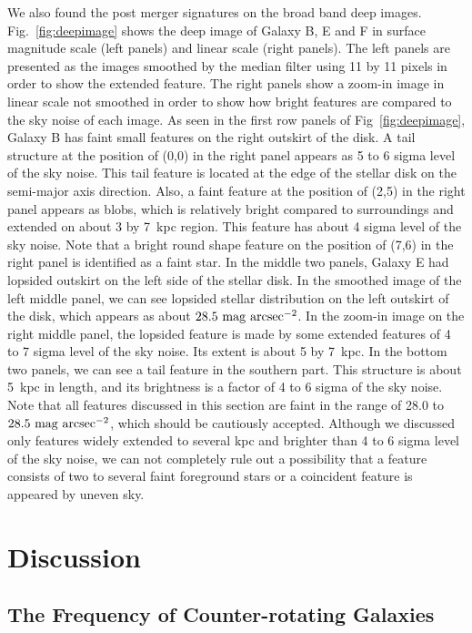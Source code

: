 \documentclass[fleqn,usenatbib]{mnras}
\begin{document}
We also found the post merger signatures on the broad band deep images.
Fig.~\ref{fig:deepimage} shows the deep image of Galaxy B, E and F
in surface magnitude scale (left panels) and linear scale (right panels).
The left panels are presented as
the images smoothed by the median filter using 11 by 11 pixels 
in order to show the extended feature. 
The right panels show a zoom-in image in linear scale not smoothed 
in order to show how bright features are compared to the sky noise
of each image.
As seen in the first row panels of Fig~\ref{fig:deepimage}, 
Galaxy B has faint small features on the right outskirt of the disk. 
A tail structure at the position of (0,0) in the right panel
appears as 5 to 6 sigma level of the sky noise. 
This tail feature is located at the edge of the stellar disk
on the semi-major axis direction.
Also, a faint feature at the position of (2,5) in the right panel
appears as blobs, which is relatively bright compared to surroundings
and extended on about 3 by 7~kpc region.
This feature has about 4 sigma level of the sky noise.
Note that a bright round shape feature on the position of (7,6)
in the right panel is identified as a faint star. 
In the middle two panels, Galaxy E had lopsided outskirt on the left side 
of the stellar disk.
In the smoothed image of the left middle panel, 
we can see lopsided stellar distribution on the left outskirt of the disk,
which appears as about $\rm 28.5~mag~arcsec^{-2}$.
In the zoom-in image on the right middle panel,
the lopsided feature is made by some extended features
of 4 to 7 sigma level of the sky noise.
Its extent is about 5 by 7~kpc.  
In the bottom two panels, 
we can see a tail feature in the southern part.
This structure is about 5~kpc in length, 
and its brightness is a factor of 4 to 6 sigma of the sky noise.
Note that all features discussed in this section are faint in the range of 
28.0 to $\rm 28.5~mag~arcsec^{-2}$, which should be cautiously accepted. 
Although we discussed only features widely extended to several kpc and 
brighter than 4 to 6 sigma level of the sky noise, 
we can not completely rule out a possibility that 
a feature consists of two to several faint foreground stars or 
a coincident feature is appeared by uneven sky.




\section{Discussion} \label{sec:discu}

\subsection{The Frequency of Counter-rotating Galaxies} \label{sec:frequency}
\end{document}
